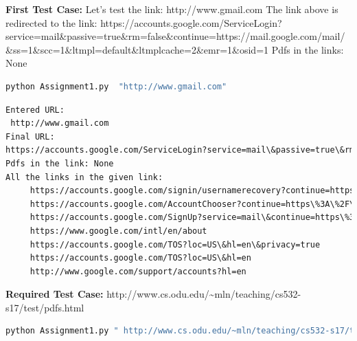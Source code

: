 \documentclass[a4paper, 11pt]{article}
\begin{document}
\noindent
\textbf{First Test Case:}
Let's test the link: 
\newline
 http://www.gmail.com
\newline
The link above is redirected to the link:
\newline
https://accounts.google.com/ServiceLogin?service=mail\&passive=true\&rm=false\&continue=https://mail.google.com/mail/\&ss=1\&scc=1\&ltmpl=default\&ltmplcache=2\&emr=1\&osid=1
\newline
\noindent
Pdfs in the links: None
\begin{lstlisting}[language=bash,label=Command:,caption=Command:]
python Assignment1.py  "http://www.gmail.com" 
\end{lstlisting}
\begin{lstlisting}[language=bash,label=Output,caption=Output:]
Entered URL:
 http://www.gmail.com
Final URL:
https://accounts.google.com/ServiceLogin?service=mail\&passive=true\&rm=false\&continue=https://mail.google.com/mail/\&ss=1\&scc=1\&ltmpl=default\&ltmplcache=2\&emr=1\&osid=1
Pdfs in the link: None
All the links in the given link:
	 https://accounts.google.com/signin/usernamerecovery?continue=https\%3A\%2F\%2Fmail.google.com\%2Fmail\%2F\&service=mail\&ss=1\&scc=1\&rm=false\&osid=1\&hl=en
	 https://accounts.google.com/AccountChooser?continue=https\%3A\%2F\%2Fmail.google.com\%2Fmail\%2F\&service=mail\&rm=false\&ltmpl=default\&scc=1\&ss=1\&osid=1\&emr=1
	 https://accounts.google.com/SignUp?service=mail\&continue=https\%3A\%2F\%2Fmail.google.com\%2Fmail\%2F\&ltmpl=default
	 https://www.google.com/intl/en/about
	 https://accounts.google.com/TOS?loc=US\&hl=en\&privacy=true
	 https://accounts.google.com/TOS?loc=US\&hl=en
	 http://www.google.com/support/accounts?hl=en
\end{lstlisting}
\noindent
\textbf{Required Test Case:}
http://www.cs.odu.edu/\textasciitilde mln/teaching/cs532-s17/test/pdfs.html
\begin{lstlisting}[language=bash,label=Command:,caption=Command:]
python Assignment1.py " http://www.cs.odu.edu/~mln/teaching/cs532-s17/test/pdfs.html"
\end{lstlisting}
\end{document}
